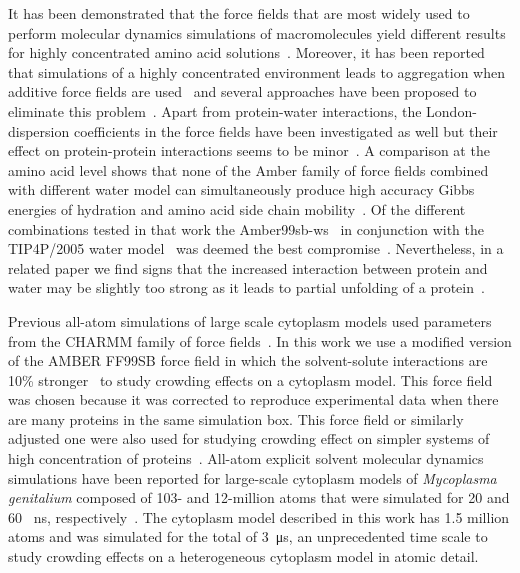 \documentclass[journal=jpcisd8,manuscript=article]{achemso}
\begin{document}
It has been demonstrated that the force fields that are most widely
used to perform molecular dynamics simulations of macromolecules yield
different results for highly concentrated amino acid
solutions~\cite{andrews2013}. Moreover, it has been reported that
simulations of a highly concentrated environment leads to aggregation
when additive force fields are used~\cite{Petrov2014a,Abriata2015a,Nawrocki2017a,Carballo2018a} and several approaches have been proposed to
eliminate this
problem~\cite{Best2014a,Piana2015a,Bashardanesh2018b,Carballo2018a}. Apart from
protein-water interactions, the London-dispersion coefficients in the
force fields have been investigated as well but their effect on
protein-protein interactions seems to be
minor~\cite{Mohebifar2017a,Walters2018a,Bashardanesh2018b}.  A
comparison at the amino acid level shows that none of the Amber family
of force fields combined with different water model can simultaneously
produce high accuracy Gibbs energies of hydration and amino acid side
chain mobility~\cite{HZhang2018a}. Of the different combinations
tested in that work the Amber99sb-ws~\cite{Best2014a} in conjunction
with the TIP4P/2005 water model~\cite{Abascal2005b} was deemed the
best compromise~\cite{HZhang2018a}. Nevertheless, in a related paper
we find signs that the increased interaction between protein and water
may be slightly too strong as it leads to partial unfolding of a
protein~\cite{Bashardanesh2019a}.

Previous all-atom simulations of large scale cytoplasm models used
parameters from the CHARMM family of force fields~\cite{Yu2016a}. In
this work we use a modified version of the AMBER FF99SB force field in
which the solvent-solute interactions are 10\%
stronger~\cite{Best2014a} to study crowding effects on a cytoplasm
model. This force field was chosen because it was corrected to
reproduce experimental data when there are many proteins in the same
simulation box. This force field or similarly adjusted one were also
used for studying crowding effect on simpler systems of high
concentration of
proteins~\cite{Nawrocki2017a,nawrocki2019,Bashardanesh2019a}. All-atom
explicit solvent molecular dynamics simulations have been reported for
large-scale cytoplasm models of \textit{Mycoplasma genitalium}
composed of 103- and 12-million atoms that were simulated for 20 and
60 \SI{}{\nano\second}, respectively~\cite{Yu2016a}. The cytoplasm
model described in this work has 1.5 million atoms and was simulated
for the total of \SI{3}{\micro\second}, an unprecedented time scale to
study crowding effects on a heterogeneous cytoplasm model in atomic
detail.
\end{document}
